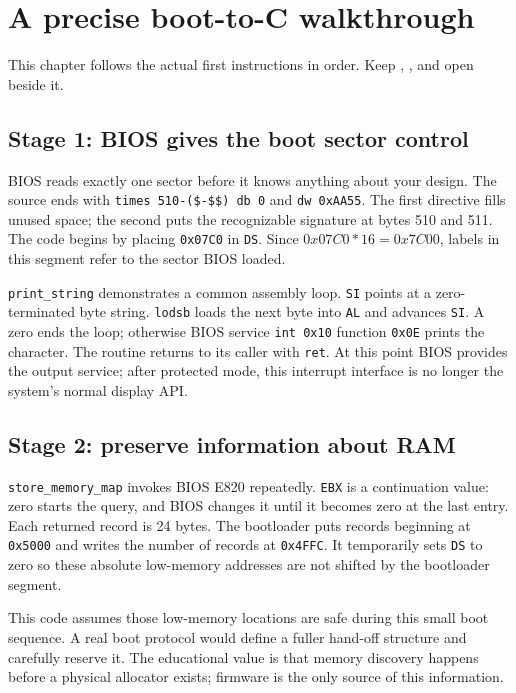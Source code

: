 
\chapter{A precise boot-to-C walkthrough}
This chapter follows the actual first instructions in order. Keep , , and  open beside it.

\section{Stage 1: BIOS gives the boot sector control}
BIOS reads exactly one sector before it knows anything about your design. The source ends with \texttt{times 510-(\$-\$\$) db 0} and \texttt{dw 0xAA55}. The first directive fills unused space; the second puts the recognizable signature at bytes 510 and 511. The code begins by placing \texttt{0x07C0} in \texttt{DS}. Since \(0x07C0 * 16 = 0x7C00\), labels in this segment refer to the sector BIOS loaded.

\texttt{print\_string} demonstrates a common assembly loop. \texttt{SI} points at a zero-terminated byte string. \texttt{lodsb} loads the next byte into \texttt{AL} and advances \texttt{SI}. A zero ends the loop; otherwise BIOS service \texttt{int 0x10} function \texttt{0x0E} prints the character. The routine returns to its caller with \texttt{ret}. At this point BIOS provides the output service; after protected mode, this interrupt interface is no longer the system's normal display API.

\section{Stage 2: preserve information about RAM}
\texttt{store\_memory\_map} invokes BIOS E820 repeatedly. \texttt{EBX} is a continuation value: zero starts the query, and BIOS changes it until it becomes zero at the last entry. Each returned record is 24 bytes. The bootloader puts records beginning at \texttt{0x5000} and writes the number of records at \texttt{0x4FFC}. It temporarily sets \texttt{DS} to zero so these absolute low-memory addresses are not shifted by the bootloader segment.

This code assumes those low-memory locations are safe during this small boot sequence. A real boot protocol would define a fuller hand-off structure and carefully reserve it. The educational value is that memory discovery happens before a physical allocator exists; firmware is the only source of this information.

